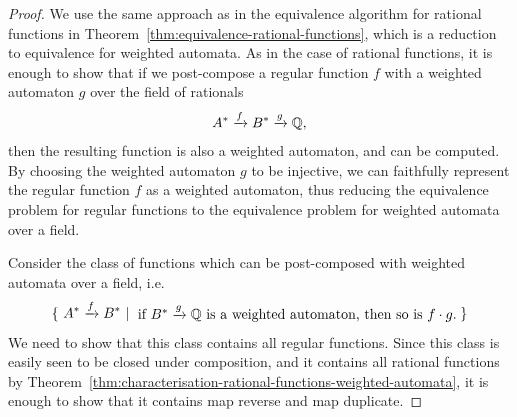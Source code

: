 \begin{proof}
    We use the same approach as in the equivalence algorithm for rational functions in Theorem~\ref{thm:equivalence-rational-functions}, which is a reduction to equivalence for weighted automata. As in the case of rational functions, it is enough to show that if we post-compose a regular function $f$ with a weighted automaton $g$ over the field of rationals
    \begin{align*}
    A^* \xrightarrow f B^* \xrightarrow g {\mathbb Q},
    \end{align*}
    then the resulting function  is also a weighted automaton, and can be computed. By choosing the weighted automaton $g$ to be injective, we can faithfully represent the regular function $f$ as a weighted automaton, thus reducing the equivalence problem for regular functions to the equivalence problem for weighted automata over a field.

    Consider the class of functions which can be post-composed with weighted automata over a field, i.e.~
    \begin{align*}
    \setbuild{ A^* \xrightarrow f B^*}{if $ B^* \xrightarrow g \Rat$ is a weighted automaton, then so is $f \cdot g$.}
    \end{align*}
    We need to show that this class contains all regular functions. Since this class is easily seen to be closed under composition, and it contains all rational functions by Theorem~\ref{thm:characterisation-rational-functions-weighted-automata}, it is enough to show that it contains map reverse and map duplicate.



\end{proof}
